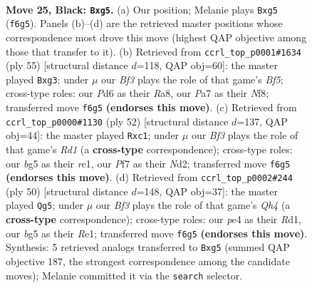 \documentclass[11pt]{article}
\begin{document}
\clearpage

\begin{figure}[p]\centering
\begin{subfigure}{0.46\textwidth}\centering
\resizebox{\linewidth}{!}{%
\newchessgame
\chessboard[
  setfen={rn1qr3/p2n1pkP/3p1b2/3P2B1/1R2P1P1/2NQ4/4N3/4K2R b K - 0 25},
  showmover=false,
  pgfstyle=straightmove, color=movearrow, markmove={f6-g5}
]}
\caption{}
\end{subfigure}\hfill
\begin{subfigure}{0.46\textwidth}\centering
\resizebox{\linewidth}{!}{%
\newchessgame
\chessboard[
  setfen={r4n1r/2q2k2/7n/1R1p3p/3P1bpP/1NP3B1/P1Q2PP1/R5K1 b - - 0 28},
  showmover=false,
  pgfstyle=straightmove, color=movearrow, markmove={f4-g3}
]}
\caption{}
\end{subfigure}
\\[4pt]
\begin{subfigure}{0.46\textwidth}\centering
\resizebox{\linewidth}{!}{%
\newchessgame
\chessboard[
  setfen={2b2r1k/3np1q1/2p1Bn1p/6p1/5p2/5NP1/Q2NPP1P/2rR2K1 w - - 0 27},
  showmover=false,
  pgfstyle=straightmove, color=movearrow, markmove={d1-c1}
]}
\caption{}
\end{subfigure}\hfill
\begin{subfigure}{0.46\textwidth}\centering
\resizebox{\linewidth}{!}{%
\newchessgame
\chessboard[
  setfen={6k1/1b4b1/pp1qrn2/3pn3/P2B2pQ/2N5/1PP3PP/3RR2K w - - 4 26},
  showmover=false,
  pgfstyle=straightmove, color=movearrow, markmove={h4-g5}
]}
\caption{}
\end{subfigure}
\caption{\textbf{Move 25, Black: \texttt{Bxg5}.} (a) Our position; Melanie plays \texttt{Bxg5} (\texttt{f6g5}). Panels (b)--(d) are the retrieved master positions whose correspondence most drove this move (highest QAP objective among those that transfer to it). (b) Retrieved from \texttt{ccrl\_top\_p0001\#1634} (ply 55) [structural distance $d$=118, QAP obj=60]: the master played \texttt{Bxg3}; under $\mu$ our \emph{Bf3} plays the role of that game's \emph{Bf5}; cross-type roles: our \emph{P}d6 as their \emph{R}a8, our \emph{P}a7 as their \emph{N}f8; transferred move \texttt{f6g5} \textbf{(endorses this move)}. (c) Retrieved from \texttt{ccrl\_top\_p0000\#1130} (ply 52) [structural distance $d$=137, QAP obj=44]: the master played \texttt{Rxc1}; under $\mu$ our \emph{Bf3} plays the role of that game's \emph{Rd1} (a \textbf{cross-type} correspondence); cross-type roles: our \emph{b}g5 as their \emph{r}c1, our \emph{P}f7 as their \emph{N}d2; transferred move \texttt{f6g5} \textbf{(endorses this move)}. (d) Retrieved from \texttt{ccrl\_top\_p0002\#244} (ply 50) [structural distance $d$=148, QAP obj=37]: the master played \texttt{Qg5}; under $\mu$ our \emph{Bf3} plays the role of that game's \emph{Qh4} (a \textbf{cross-type} correspondence); cross-type roles: our \emph{p}e4 as their \emph{R}d1, our \emph{b}g5 as their \emph{R}e1; transferred move \texttt{f6g5} \textbf{(endorses this move)}. Synthesis: 5 retrieved analogs transferred to \texttt{Bxg5} (summed QAP objective 187, the strongest correspondence among the candidate moves); Melanie committed it via the \texttt{search} selector.}
\label{fig:thought-m49}
\end{figure}
\end{document}
